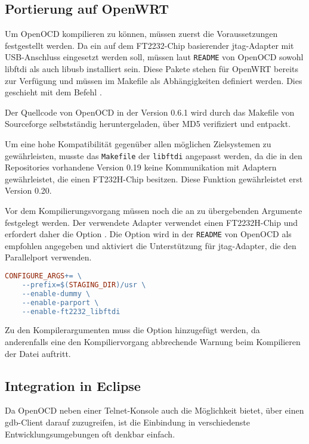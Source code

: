 \subsection{Portierung auf OpenWRT}
Um OpenOCD kompilieren zu können, müssen zuerst die Voraussetzungen festgestellt
werden. Da ein auf dem FT2232-Chip basierender \gls{jtag}-Adapter mit
USB-Anschluss eingesetzt werden soll, müssen laut \texttt{README} von OpenOCD
sowohl libftdi als auch libusb installiert sein. Diese Pakete stehen für OpenWRT
bereits zur Verfügung und müssen im Makefile als Abhängigkeiten definiert
werden. Dies geschieht mit dem Befehl .

Der Quellcode von OpenOCD in der Version 0.6.1 wird durch das Makefile von
Sourceforge selbstständig heruntergeladen, über MD5 verifiziert und entpackt.

Um eine hohe Kompatibilität gegenüber allen möglichen Zielsystemen zu
gewährleisten, musste das \texttt{Makefile} der \texttt{libftdi} angepasst werden, da die in den
Repositories vorhandene Version 0.19  keine Kommunikation mit Adaptern
gewährleistet, die einen FT232H-Chip besitzen. Diese Funktion gewährleistet erst
Version 0.20.

Vor dem Kompilierungsvorgang müssen noch die an 
zu übergebenden Argumente festgelegt werden. Der verwendete Adapter
verwendet einen FT2232H-Chip und erfordert daher die Option
.
Die Option  wird in der \texttt{README} von OpenOCD als
empfohlen angegeben und aktiviert die Unterstützung für \gls{jtag}-Adapter, die
den Parallelport verwenden.

\begin{lstlisting}[language=make]
CONFIGURE_ARGS+= \
	--prefix=$(STAGING_DIR)/usr \
	--enable-dummy \
	--enable-parport \
	--enable-ft2232_libftdi
\end{lstlisting}

Zu den Kompilerargumenten muss die Option
 hinzugefügt werden, da anderenfalls
eine den Kompiliervorgang abbrechende Warnung beim Kompilieren der Datei
 auftritt.
\subsection{Integration in Eclipse}
Da OpenOCD neben einer Telnet-Konsole auch die Möglichkeit bietet, über einen
\gls{gdb}-Client darauf zuzugreifen, ist die Einbindung in verschiedenste
Entwicklungsumgebungen oft denkbar einfach.

